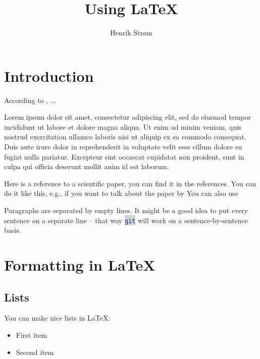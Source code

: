 \documentclass[a4paper, twocolumn]{article}
\author{Henrik Strøm}
\title{Using \LaTeX}
\newcommand{\inlinecode}[2]{\colorbox{lightgray}{\lstinline[language=#1]$#2$}}
\begin{document}


\section{Introduction\label{sec:Introduction}}
According to \cite{example_website}, ...

Lorem ipsum dolor sit amet, consectetur adipiscing elit, sed do eiusmod tempor incididunt ut labore et dolore magna aliqua. Ut enim ad minim veniam, quis nostrud exercitation ullamco laboris nisi ut aliquip ex ea commodo consequat. Duis aute irure dolor in reprehenderit in voluptate velit esse cillum dolore eu fugiat nulla pariatur. Excepteur sint occaecat cupidatat non proident, sunt in culpa qui officia deserunt mollit anim id est laborum.

Here is a reference to a scientific paper, you can find it in the references.
\cite{lecun1995convolutional}
You can do it like this, e.g., if you want to talk about the paper by
\textcite{lecun1995convolutional}
You can also use
\parencite{lecun1995convolutional}


Paragraphs are separated by empty lines.
It might be a good idea to put every sentence on a separate line -- that way \inlinecode{bash}{git} will work on a sentence-by-sentence basis.

\section{Formatting in \LaTeX\label{sec:Formatting in Latex}}


\subsection{Lists}
\label{sec:Lists}

You can make nice lists in \LaTeX:

\begin{itemize}
    \item First item
    \item Second item
\end{itemize}
\end{document}
